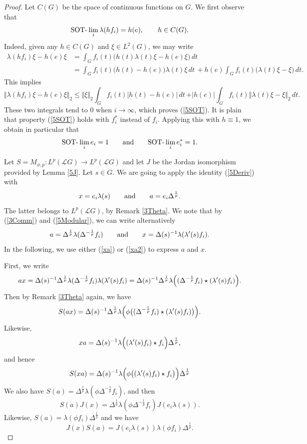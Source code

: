 \documentclass[12pt]{amsart}
\newcommand{\norm}[1]{\Vert#1\Vert}
\newcommand{\bignorm}[1]{\bigl\Vert#1\bigr\Vert}
\theoremstyle{remark}
\theoremstyle{definition}
\numberwithin{equation}{section}
\begin{document}
\begin{proof}
 Let 
$C(G)$ be the space of continuous functions on $G$. We first observe
that 
\begin{equation}\label{5SOT}
\hbox{SOT-}\lim_i \lambda(hf_i) =
h(e),\qquad h\in C(G).
\end{equation}
Indeed, given any $h\in C(G)$ and $\xi\in L^2(G)$, we may write
\begin{align*}
\lambda(hf_i)\xi - h(e)\xi
&=\int_G f_i(t) \bigl(h(t)\lambda(t)\xi -h(e)\xi\bigr)\, dt\\
&=\int_G f_i(t) \bigl(h(t)-h(e)\bigr)
\lambda(t)\xi\, dt\, +h(e)\int_G
f_i(t)\bigl(\lambda(t)\xi-\xi\bigr)\, dt.
\end{align*}
This implies
$$
\bignorm{\lambda(hf_i)\xi - h(e)\xi}_2\leq \norm{\xi}_2 \int_G f_i(t) \bigl\vert h(t)-h(e)\bigr\vert\,
 dt\, +\vert h(e)\vert\int_G
f_i(t)\norm{\lambda(t)\xi-\xi}_2\, dt.
$$
These two integrals tend to $0$ when $i\to\infty$, which proves (\ref{5SOT}).
It is plain that property  (\ref{5SOT}) holds with $f_i^*$ instead of $f_i$.
Applying this with $h\equiv 1$, we obtain in particular that 
\begin{equation}\label{5ei}
\hbox{SOT-}\lim_i e_i=1
\qquad\hbox{and}\qquad
\hbox{SOT-}\lim_i e_i^*=1.
\end{equation}






Let $S=M_{\phi,p} \colon L^p({\mathcal L}G)\to L^p({\mathcal L}G)$ and let 
$J$ be the  Jordan isomorphism provided by Lemma \ref{5J}.
Let $s\in G$. We are going to apply the identity 
(\ref{5Deriv}) with 
\begin{equation}\label{xa}
x=e_i\lambda(s)
\qquad\hbox{and}\qquad
a=e_i\Delta^{\frac{1}{p}}.
\end{equation}
The latter belongs to $L^p({\mathcal L}G)$, by Remark  \ref{3Theta}.
We note that by (\ref{3Comm}) and (\ref{5Modular}), we 
can write alternatively
\begin{equation}\label{xa2}
a=\Delta^{\frac{1}{p}}\lambda(\Delta^{-\frac{1}{p}}f_i)
\qquad\hbox{and}\qquad
x=\Delta(s)^{-1}\lambda(\lambda'(s)f_i).
\end{equation}
In the following, we use either
(\ref{xa}) or (\ref{xa2})
to express $a$ and $x$.


First, we write
$$
ax= \Delta(s)^{-1}\Delta^{\frac{1}{p}}\lambda(\Delta^{-\frac{1}{p}}f_i) 
\lambda(\lambda'(s)f_i)
= \Delta(s)^{-1} \Delta^{\frac{1}{p}}
\lambda\Bigl((\Delta^{-\frac{1}{p}}f_i) \star (\lambda'(s)f_i)\Bigr).
$$
Then by Remark  \ref{3Theta} again, we have 
$$
S(ax) = \Delta(s)^{-1} \Delta^{\frac{1}{p}}
\lambda\Bigl(\phi\bigl(
(\Delta^{-\frac{1}{p}}f_i) \star (\lambda'(s)f_i)\bigr)\Bigr).
$$
Likewise,
$$
xa = \Delta(s)^{-1}\lambda\Bigl((\lambda'(s)f_i) \star 
f_i\Bigr)\Delta^{\frac{1}{p}},
$$
and hence
$$
S(xa) = \Delta(s)^{-1}\lambda\Bigl(\phi\bigl((\lambda'(s)f_i) \star 
f_i\bigr)\Bigr)\Delta^{\frac{1}{p}}
$$
We also have $S(a)=\Delta^{\frac{1}{p}}
\lambda(\phi\Delta^{-\frac{1}{p}}f_i)$, and then
$$
S(a)J(x) = \Delta^{\frac{1}{p}}
\lambda(\phi\Delta^{-\frac{1}{p}}f_i)
J(e_i\lambda(s)).
$$
Likewise,  $S(a)= \lambda(\phi f_i)\Delta^{\frac{1}{p}}$ and we have
$$
J(x)S(a) = J(e_i\lambda(s))\lambda(\phi f_i)\Delta^{\frac{1}{p}}.
$$




\end{proof}
\end{document}
